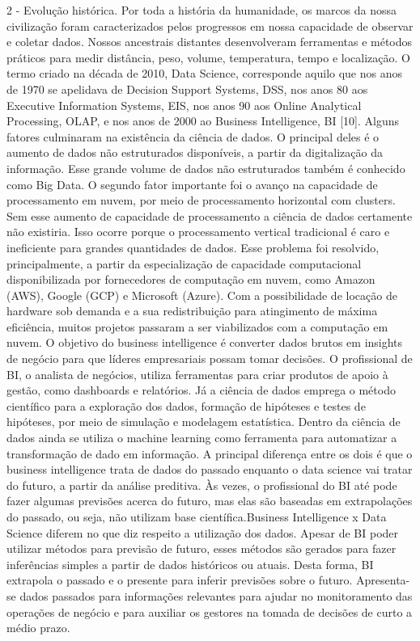 2 - Evolução histórica.
Por toda a história da humanidade, os marcos da nossa civilização foram caracterizados pelos progressos em nossa capacidade de observar e coletar dados. Nossos ancestrais distantes desenvolveram ferramentas e métodos práticos para medir distância, peso, volume, temperatura, tempo e localização.
O termo criado na década de 2010, Data Science, corresponde aquilo que nos anos de 1970 se apelidava de Decision Support Systems, DSS, nos anos 80 aos Executive Information Systems, EIS, nos anos 90 aos Online Analytical Processing, OLAP, e nos anos de 2000 ao Business Intelligence, BI [10].
Alguns fatores culminaram na existência da ciência de dados. O principal deles é o aumento de dados não estruturados disponíveis, a partir da digitalização da informação. Esse grande volume de dados não estruturados também é conhecido como Big Data.
O segundo fator importante foi o avanço na capacidade de processamento em nuvem, por meio de processamento horizontal com clusters. Sem esse aumento de capacidade de processamento a ciência de dados certamente não existiria. Isso ocorre porque o processamento vertical tradicional é caro e ineficiente para grandes quantidades de dados.
Esse problema foi resolvido, principalmente, a partir da especialização de capacidade computacional disponibilizada por fornecedores de computação em nuvem, como Amazon (AWS), Google (GCP) e Microsoft (Azure). Com a possibilidade de locação de hardware sob demanda e a sua redistribuição para atingimento de máxima eficiência, muitos projetos passaram a ser viabilizados com a computação em nuvem.
O objetivo do business intelligence é converter dados brutos em insights de negócio para que líderes empresariais possam tomar decisões. O profissional de BI, o analista de negócios, utiliza ferramentas para criar produtos de apoio à gestão, como dashboards e relatórios.
Já a ciência de dados emprega o método científico para a exploração dos dados, formação de hipóteses e testes de hipóteses, por meio de simulação e modelagem estatística. Dentro da ciência de dados ainda se utiliza o machine learning como ferramenta para automatizar a transformação de dado em informação.
A principal diferença entre os dois é que o business intelligence trata de dados do passado enquanto o data science vai tratar do futuro, a partir da análise preditiva. Às vezes, o profissional do BI até pode fazer algumas previsões acerca do futuro, mas elas são baseadas em extrapolações do passado, ou seja, não utilizam base científica.Business Intelligence x Data Science diferem no que diz respeito a utilização dos dados. Apesar de BI poder utilizar métodos para previsão de futuro, esses métodos são gerados para fazer inferências simples a partir de dados históricos ou atuais. Desta forma, BI extrapola o passado e o presente para inferir previsões sobre o futuro. Apresenta-se dados passados para informações relevantes para ajudar no monitoramento das operações de negócio e para auxiliar os gestores na tomada de decisões de curto a médio prazo.
